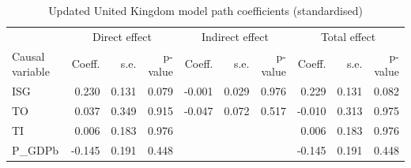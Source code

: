 \documentclass[11pt,a4paper]{article}
\begin{document}
\begin{table}[htbp]
\centering
\begin{adjustbox}{max width=\textwidth}
\begin{tabular}{l|rrr|rrr|rrr}
\toprule
 				& \multicolumn{3}{c|}{Direct effect}  & \multicolumn{3}{c|}{Indirect effect} & \multicolumn{3}{c}{Total effect} \\
Causal variable & Coeff. & s.e. & p-value & Coeff. & s.e. & p-value & Coeff. & s.e. & p-value \\
\midrule
            ISG &     0.230 &   0.131 &      0.079 &    -0.001 &   0.029 &      0.976 &     0.229 &   0.131 &      0.082 \\
             TO &     0.037 &   0.349 &      0.915 &    -0.047 &   0.072 &      0.517 &    -0.010 &   0.313 &      0.975 \\
             TI &     0.006 &   0.183 &      0.976 &           &         &            &     0.006 &   0.183 &      0.976 \\
        P\_GDPb &    -0.145 &   0.191 &      0.448 &           &         &            &    -0.145 &   0.191 &      0.448 \\
\bottomrule
\end{tabular}
\end{adjustbox}
\caption{Updated United Kingdom model path coefficients (standardised)}
\label{tab:gbr_path_coeff}
\end{table}
\end{document}
